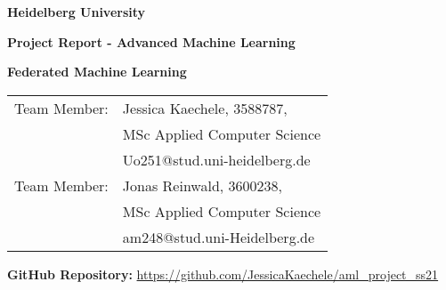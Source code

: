 \documentclass[
     12pt,         %
     a4paper,      %
     BCOR10mm,     %
     DIV14,        %
     ]{article}
\begin{document}
\begin{titlepage}


\begin{center}
\textbf{ 
\Large Heidelberg University\\
\smallskip
}

\vspace{2cm}

\textbf{\large Project Report - Advanced Machine Learning}

\vspace{0.5\baselineskip}
{\huge
\textbf{Federated Machine Learning}
}
\end{center}

\vfill 

{\large
\begin{tabular}[l]{ll}
Team Member: & Jessica Kaechele, 3588787,\\ & MSc Applied Computer Science\\
  & Uo251@stud.uni-heidelberg.de\\
Team Member: & Jonas Reinwald, 3600238, \\ & MSc Applied Computer Science\\
  & am248@stud.uni-Heidelberg.de\\
\end{tabular}
}
\vspace*{2cm}

{
  \begin{center}
  \textbf{GitHub Repository:}
  \url{https://github.com/JessicaKaechele/aml_project_ss21}
  \end{center}
}

\vspace*{.5cm}

\end{titlepage} 

% 
\newpage
\tableofcontents

\newpage
\listoffigures
\listoftables
\lstlistoflistings

\newpage

\end{document}
